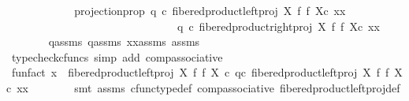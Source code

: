 \begin{isabellebody}
\ \ \ \ \ \ \isanewline
\ \ \ \ \isamarkupfalse%
\ projection{\isacharunderscore}{\kern0pt}prop{\isacharcolon}{\kern0pt}\ {\isachardoublequoteopen}q{}\ {\isasymcirc}\isactrlsub c\ {\isacharparenleft}{\kern0pt}{\isacharparenleft}{\kern0pt}fibered{\isacharunderscore}{\kern0pt}product{\isacharunderscore}{\kern0pt}left{\isacharunderscore}{\kern0pt}proj\ X\ f\ f\ X{\isacharparenright}{\kern0pt}{\isasymcirc}\isactrlsub c\ xx{\isacharparenright}{\kern0pt}\ {\isacharequal}{\kern0pt}\ \isanewline
\ \ \ \ \ \ \ \ \ \ \ \ \ \ \ \ \ \ \ \ \ \ \ \ \ \ \ \ \ \ \ q{}\ {\isasymcirc}\isactrlsub c\ {\isacharparenleft}{\kern0pt}{\isacharparenleft}{\kern0pt}fibered{\isacharunderscore}{\kern0pt}product{\isacharunderscore}{\kern0pt}right{\isacharunderscore}{\kern0pt}proj\ X\ f\ f\ X{\isacharparenright}{\kern0pt}{\isasymcirc}\isactrlsub c\ xx{\isacharparenright}{\kern0pt}{\isachardoublequoteclose}\isanewline
\ \ \ \ \ \ \isamarkupfalse%
\ q{}{\isacharunderscore}{\kern0pt}assms\ q{}{\isacharunderscore}{\kern0pt}assms\ xx{\isacharunderscore}{\kern0pt}assms\ assms\ \isamarkupfalse%
\ {\isacharparenleft}{\kern0pt}typecheck{\isacharunderscore}{\kern0pt}cfuncs{\isacharcomma}{\kern0pt}\ simp\ add{\isacharcolon}{\kern0pt}\ comp{\isacharunderscore}{\kern0pt}associative{}{\isacharparenright}{\kern0pt}\isanewline
\ \ \ \ \isamarkupfalse%
\ \isamarkupfalse%
\ fun{\isacharunderscore}{\kern0pt}fact{\isacharcolon}{\kern0pt}\ {\isachardoublequoteopen}x\ {\isacharequal}{\kern0pt}\ {\isacharparenleft}{\kern0pt}{\isacharparenleft}{\kern0pt}fibered{\isacharunderscore}{\kern0pt}product{\isacharunderscore}{\kern0pt}left{\isacharunderscore}{\kern0pt}proj\ X\ f\ f\ X{\isacharparenright}{\kern0pt}\ {\isasymcirc}\isactrlsub c\ q{}{\isacharparenright}{\kern0pt}{\isasymcirc}\isactrlsub c\ {\isacharparenleft}{\kern0pt}{\isacharparenleft}{\kern0pt}{\isacharparenleft}{\kern0pt}fibered{\isacharunderscore}{\kern0pt}product{\isacharunderscore}{\kern0pt}left{\isacharunderscore}{\kern0pt}proj\ X\ f\ f\ X{\isacharparenright}{\kern0pt}{\isasymcirc}\isactrlsub c\ xx{\isacharparenright}{\kern0pt}{\isacharparenright}{\kern0pt}{\isachardoublequoteclose}\isanewline
\ \ \ \ \ \ \isamarkupfalse%
\ {\isacharparenleft}{\kern0pt}smt\ assms{\isacharparenleft}{\kern0pt}{}{\isacharparenright}{\kern0pt}\ cfunc{\isacharunderscore}{\kern0pt}type{\isacharunderscore}{\kern0pt}def\ comp{\isacharunderscore}{\kern0pt}associative{}\ fibered{\isacharunderscore}{\kern0pt}product{\isacharunderscore}{\kern0pt}left{\isacharunderscore}{\kern0pt}proj{\isacharunderscore}{\kern0pt}def\isanewline

\end{isabellebody}
